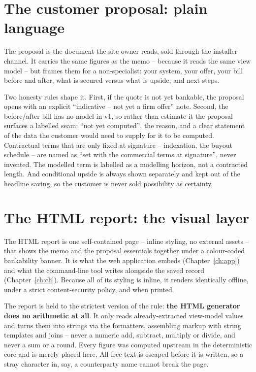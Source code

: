 \section{The customer proposal: plain language}

The proposal is the document the site owner reads, sold through the installer channel. It carries the same figures as the memo -- because it reads the same view model -- but frames them for a non-specialist: your system, your offer, your bill before and after, what is secured versus what is upside, and next steps.

Two honesty rules shape it. First, if the quote is not yet bankable, the proposal opens with an explicit ``indicative -- not yet a firm offer'' note. Second, the before/after bill has no model in v1, so rather than estimate it the proposal surfaces a labelled seam: ``not yet computed'', the reason, and a clear statement of the data the customer would need to supply for it to be computed. Contractual terms that are only fixed at signature -- indexation, the buyout schedule -- are named as ``set with the commercial terms at signature'', never invented. The modelled term is labelled as a modelling horizon, not a contracted length. And conditional upside is always shown separately and kept out of the headline saving, so the customer is never sold possibility as certainty.

\section{The HTML report: the visual layer}

The HTML report is one self-contained page -- inline styling, no external assets -- that shows the memo and the proposal essentials together under a colour-coded bankability banner. It is what the web application embeds (Chapter~\ref{ch:app}) and what the command-line tool writes alongside the saved record (Chapter~\ref{ch:cli}). Because all of its styling is inline, it renders identically offline, under a strict content-security policy, and when printed.

The report is held to the strictest version of the rule: \textbf{the HTML generator does no arithmetic at all}. It only reads already-extracted view-model values and turns them into strings via the formatters, assembling markup with string templates and joins -- never a numeric add, subtract, multiply or divide, and never a sum or a round. Every figure was computed upstream in the deterministic core and is merely placed here. All free text is escaped before it is written, so a stray character in, say, a counterparty name cannot break the page.

